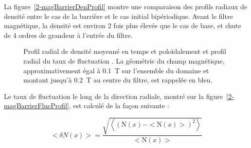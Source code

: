 \begin{refsection}
La figure~\ref{2-magBarrierDenProfil} montre une comparaison des profils radiaux de
densité entre le
cas de la barrière et le cas initial bipériodique.
Avant le filtre magnétique, la densité est environ 2 fois plus élevée que le
cas de base, et chute de 4 ordres de grandeur à l'entrée du filtre.

\begin{figure}[!htbp]
    \centering
    \caption{Profil radial de densité moyenné en temps et poloïdalement
     et profil radial du taux de fluctuation
    .
    La géométrie du champ magnétique, approximativement égal à 0.1~T sur
    l'ensemble du domaine et montant jusqu'à 0.2~T au centre du filtre, est
    rappelée en bleu.}
    \label{2-ProfMagBarrier}
\end{figure} 

Le taux de fluctuation le long de la direction radiale, montré sur la
figure~\ref{2-magBarrierFlucProfil}, est calculé de la façon suivante :

\begin{equation}
<\delta N(x)>=\frac{\sqrt{\left<(\text{N}(x)-<\text{N}(x)>)^2\right>}}{<\text{N}(x)>}
\end{equation}


\end{refsection}
